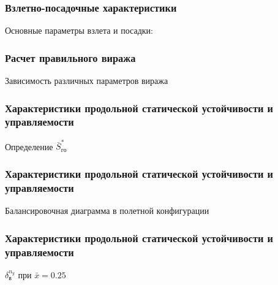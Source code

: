 \documentclass{beamer}
\begin{document}
\begin{frame}[t]
    \frametitle{Взлетно-посадочные характеристики}
    \vfill
    \begin{center}
        Основные параметры взлета и посадки:
        
    \end{center}
    \vfill
\end{frame}

\begin{frame}[t]
    \frametitle{Расчет правильного виража}
    \begin{center}
        Зависимость различных параметров виража
        \resizebox{.70\linewidth}{!}{}
    \end{center}
\end{frame}

\begin{frame}[t]
    \frametitle{Характеристики продольной статической устойчивости и управляемости}
    \begin{center}
        Определение $\bar{S}_{го}^*$ 

        \resizebox{.70\linewidth}{!}{}
    \end{center} 
\end{frame}

\begin{frame}[t]
    \frametitle{Характеристики продольной статической устойчивости и управляемости}
    \begin{center}
        Балансировочная диаграмма в полетной конфигурации 
        \resizebox{.70\linewidth}{!}{}
    \end{center}
\end{frame}

\begin{frame}[t]
    \frametitle{Характеристики продольной статической устойчивости и управляемости}
    \begin{center}
        $\delta_{в}^{n_y}$ при $\bar{x} = 0.25$

        \resizebox{0.70\textwidth}{!}{}
    \end{center}
\end{frame}
\end{document}
